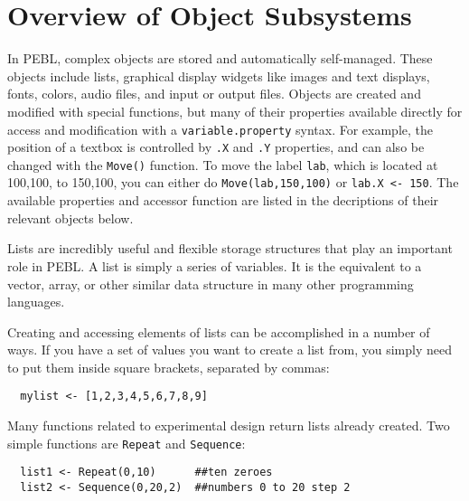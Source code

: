 
\chapter
{Overview of Object Subsystems}

In PEBL, complex objects are stored and automatically self-managed.
These objects include lists, graphical display widgets like images and
text displays, fonts, colors, audio files, and input or output files.
Objects are created and modified with special functions, but many of
their properties available directly for access and modification with a
\texttt{variable.property} syntax.  For example, the position of a
textbox is controlled by \verb+.X+ and \verb+.Y+ properties, and can
also be changed with the \verb+Move()+ function.  To move the label
\texttt{lab}, which is located at 100,100, to 150,100, you can either
do \texttt{Move(lab,150,100)} or \verb+lab.X <- 150+.  The available
properties and accessor function are listed in the decriptions of
their relevant objects below.



Lists are incredibly useful and flexible storage structures that play
an important role in PEBL. A list is simply a series of variables. It
is the equivalent to a vector, array, or other similar data structure in many other 
programming languages.

Creating and accessing elements of lists can be accomplished in a number of ways.  If you have a set 
of values you want to create a list from, you simply need to put them inside square brackets, separated by commas:

\begin{verbatim}
  mylist <- [1,2,3,4,5,6,7,8,9]
\end{verbatim}

Many functions related to experimental design return lists already created. Two simple functions are \verb+Repeat+ and \verb+Sequence+:
\begin{verbatim}
  list1 <- Repeat(0,10)      ##ten zeroes
  list2 <- Sequence(0,20,2)  ##numbers 0 to 20 step 2
\end{verbatim}

